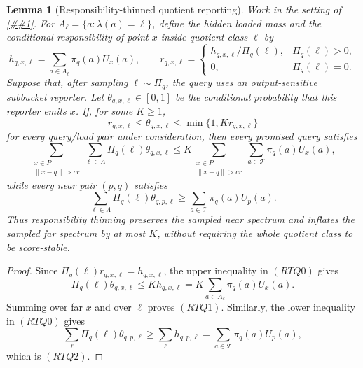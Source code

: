 \documentclass[10pt]{article}
\newcommand{\cref}[1]{\ref{##1}}
\newtheorem{lemma}[theorem]{Lemma}
\theoremstyle{definition}
\begin{document}
\begin{lemma}[Responsibility-thinned quotient reporting]
   \label{lem:responsibility-thinned-quotient}
   Work in the setting of \cref{lem:stable-quotient-sampled-spectrum}.  For
   \(A_\ell=\{a:\lambda(a)=\ell\}\), define the hidden loaded mass and the
   conditional responsibility of point \(x\) inside quotient class \(\ell\) by
   \[
      h_{q,x,\ell}
      =
      \sum_{a\in A_\ell}\pi_q(a)U_x(a),
      \qquad
      r_{q,x,\ell}
      =
      \begin{cases}
      h_{q,x,\ell}/\Pi_q(\ell), & \Pi_q(\ell)>0,\\
      0, & \Pi_q(\ell)=0 .
      \end{cases}
   \]
   Suppose that, after sampling \(\ell\sim\Pi_q\), the query uses an
   output-sensitive subbucket reporter.  Let
   \(\theta_{q,x,\ell}\in[0,1]\) be the conditional probability that this
   reporter emits \(x\).  If, for some \(K\ge1\),
   \[
      r_{q,x,\ell}
      \le
      \theta_{q,x,\ell}
      \le
      \min\{1,K r_{q,x,\ell}\}
      \tag{RTQ0}
   \]
   for every query/load pair under consideration, then every promised query
   satisfies
   \[
      \sum_{\substack{x\in P\\ \|x-q\|>cr}}
      \sum_{\ell\in\Lambda}\Pi_q(\ell)\theta_{q,x,\ell}
      \le
      K
      \sum_{\substack{x\in P\\ \|x-q\|>cr}}
      \sum_{a\in\mathcal T}\pi_q(a)U_x(a),
      \tag{RTQ1}
   \]
   while every near pair \((p,q)\) satisfies
   \[
      \sum_{\ell\in\Lambda}\Pi_q(\ell)\theta_{q,p,\ell}
      \ge
      \sum_{a\in\mathcal T}\pi_q(a)U_p(a).
      \tag{RTQ2}
   \]
   Thus responsibility thinning preserves the sampled near spectrum and
   inflates the sampled far spectrum by at most \(K\), without requiring the
   whole quotient class to be score-stable.
\end{lemma}

\begin{proof}
   Since \(\Pi_q(\ell)r_{q,x,\ell}=h_{q,x,\ell}\), the upper inequality in
   \((RTQ0)\) gives
   \[
      \Pi_q(\ell)\theta_{q,x,\ell}
      \le
      K h_{q,x,\ell}
      =
      K\sum_{a\in A_\ell}\pi_q(a)U_x(a).
   \]
   Summing over far \(x\) and over \(\ell\) proves \((RTQ1)\).  Similarly, the
   lower inequality in \((RTQ0)\) gives
   \[
      \sum_\ell\Pi_q(\ell)\theta_{q,p,\ell}
      \ge
      \sum_\ell h_{q,p,\ell}
      =
      \sum_{a\in\mathcal T}\pi_q(a)U_p(a),
   \]
   which is \((RTQ2)\).
\end{proof}
\end{document}
